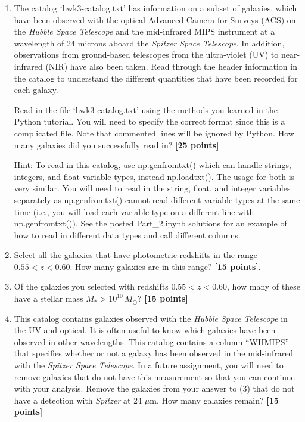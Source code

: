 \documentclass[11pt]{article}    %
\begin{document}
\begin{enumerate}

\vspace{1mm}
\item
\noindent
The catalog  `hwk3-catalog.txt' has information on a subset of 
galaxies, which have been observed with the optical 
Advanced Camera for Surveys (ACS) on the {\it Hubble Space Telescope}
and the mid-infrared MIPS  instrument at a wavelength of 24 microns aboard 
the {\it Spitzer Space Telescope}.  In addition, observations from 
ground-based telescopes from the ultra-violet (UV) to near-infrared (NIR) 
have also been taken.  Read through the header information in the catalog
to understand the different quantities that have been recorded for 
each galaxy. 

Read in the file  `hwk3-catalog.txt' using the methods you learned
in the Python tutorial.  You will need to specify the correct format since this is a
complicated file.  Note that commented lines will be ignored by Python. How many galaxies did you successfully read in? \textbf{[25 points]}

\vspace{2mm}

Hint: To read in this catalog, use np.genfromtxt() which can handle strings, integers, and float variable types, instead np.loadtxt(). The usage for both is very similar. You will need to read in the string, float, and integer variables separately as np.genfromtxt() cannot read different variable types at the same time (i.e., you will load each variable type on a different line with np.genfromtxt()). See the posted Part\_2.ipynb solutions for an example of how to read in different data types and call different columns.

\vspace{1mm}
\item
\noindent
 Select all the galaxies that have photometric redshifts in the
range $0.55 < z < 0.60$.  How many galaxies are in this range? 
\textbf{[15 points]}.


\vspace{1mm}
\item
\noindent
 Of the galaxies you selected with redshifts $0.55 < z < 0.60$, how
many of these have a stellar mass $M_* > 10^{10} \, M_{\odot}$? 
\textbf{[15 points]}


\vspace{1mm}
\item
\noindent
 This catalog contains galaxies observed with
the \emph{Hubble Space Telescope} in the UV and optical.  It is often
useful to know which galaxies have been observed in other
wavelengths.  This catalog contains a column ``WHMIPS'' that specifies
whether or not a galaxy has been observed in the mid-infrared with 
the \emph{Spitzer Space Telescope}.  In a future assignment, you will
need to remove galaxies that do not have this measurement so that you
can continue with your analysis.  Remove the galaxies from your answer
to (3) that do not have a detection with \emph{Spitzer} at 24 $\mu$m.
How many galaxies remain? \textbf{[15 points]}


\end{enumerate}
\end{document}
